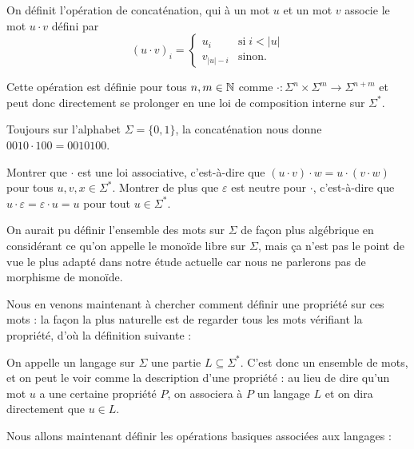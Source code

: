 \begin{defi}[Concaténation]
    On définit l'opération de concaténation, qui à un mot $u$ et un mot $v$ associe le mot $u\cdot v$ défini par $$(u\cdot v)_i =\left\{\begin{array}{ll} u_i & \mbox{si}\; i<|u| \\ v_{|u|-i} & \mbox{sinon.} \end{array}\right.$$

    Cette opération est définie pour tous $n,m\in\mathbb{N}$ comme $\cdot : \Sigma^n\times \Sigma^m \to \Sigma^{n+m}$ et peut donc directement se prolonger en une loi de composition interne sur $\Sigma^*$.
\end{defi}

\begin{expl}
    Toujours sur l'alphabet $\Sigma= \{0,1\}$, la concaténation nous donne $0010\cdot 100 = 0010100$.
\end{expl}

\begin{exo}
    Montrer que $\cdot$ est une loi associative, c'est-à-dire que $(u\cdot v)\cdot w = u\cdot (v\cdot w)$ pour tous $u,v,x\in\Sigma^*$. Montrer de plus que $\varepsilon$ est neutre pour $\cdot$, c'est-à-dire que $u\cdot\varepsilon = \varepsilon \cdot u = u$ pour tout $u\in\Sigma^*$.
\end{exo}

\begin{rmk}
    On aurait pu définir l'ensemble des mots sur $\Sigma$ de façon plus algébrique en considérant ce qu'on appelle le monoïde libre sur $\Sigma$, mais ça n'est pas le point de vue le plus adapté dans notre étude actuelle car nous ne parlerons pas de morphisme de monoïde.
\end{rmk}

Nous en venons maintenant à chercher comment définir une propriété sur ces mots : la façon la plus naturelle est de regarder tous les mots vérifiant la propriété, d'où la définition suivante :

\begin{defi}[Langage]
    On appelle un langage sur $\Sigma$ une partie $L\subseteq\Sigma^*$. C'est donc un ensemble de mots, et on peut le voir comme la description d'une propriété : au lieu de dire qu'un mot $u$ a une certaine propriété $P$, on associera à $P$ un langage $L$ et on dira directement que $u\in L$.
\end{defi}

Nous allons maintenant définir les opérations basiques associées aux langages :

